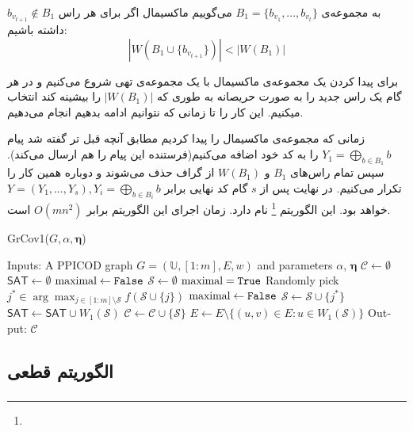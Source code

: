 به مجموعه‌ی 
$B_1 = \{b_{v_1}, \ldots, b_{v_t}\}$
می‌گوییم ماکسیمال اگر برای هر راس
$b_{v_{t  +1}} \notin B_1$
داشته باشیم:
\begin{equation}
	\tag{شرط ماکسیمال بودن}
	|W(B_1 \cup \{b_{v_{t + 1}} \})| < |W(B_1)|
\end{equation}

برای پیدا کردن یک مجموعه‌ی ماکسیمال با یک مجموعه‌ی تهی شروع می‌کنیم و در هر گام یک راس جدید را به صورت حریصانه به طوری که 
$|W(B_1)|$
را بیشینه کند انتخاب میکنیم. این کار را تا زمانی که نتوانیم ادامه بدهیم انجام می‌دهیم.

زمانی که مجموعه‌ی ماکسیمال را پیدا کردیم مطابق آنچه قبل تر گفته شد پیام
 $Y_1 = \bigoplus\limits_{b \in B_1} b$
 را به کد خود اضافه می‌کنیم(فرستنده این پیام را هم ارسال می‌کند). سپس تمام راس‌های
 $B_1$
 و
 $W(B_1)$
 از گراف حذف می‌شوند و دوباره همین کار را تکرار می‌کنیم. در نهایت پس از 
 $s$
 گام کد نهایی برابر
 $Y = (Y_1, \ldots, Y_s), Y_i =  \bigoplus\limits_{b \in B_i} b$
 خواهد بود. این الگوریتم
 \GRCOVone\footnote{}
 	نام دارد. زمان اجرای این الگوریتم برابر
 	$O(mn^2)$
 	است.
 	\begin{latin}
 	\begin{algorithm}[H]
 		\caption{GrCov1($G,\alpha,\boldsymbol{\eta}$) \cite{bibid}}
 		\label{algorithm:grcov1}
 		\begin{algorithmic}[1]
 			\State Inputs: A PPICOD graph $G=(\mathbb{U}, [1:m], E, w)$ and parameters $\alpha$, $\boldsymbol{\eta}$
 			\State $\mathcal{C} \gets \emptyset$
 			\State $\mathsf{SAT} \gets \emptyset$ 
 			\State $\textrm{maximal} \gets \texttt{False}$
 			\State $\mathcal{S} \gets \emptyset$
 			\State $\textrm{maximal} = \texttt{True}$
 			\State Randomly pick $j^* \in \arg \max_{j \in [1:m] \setminus \mathcal{S}} f(\mathcal{S} \cup \{j\})$
 			\State $\textrm{maximal} \gets \texttt{False}$
 			\State $\mathcal{S} \gets \mathcal{S} \cup \{j^*\}$
 			\EndIf
 			\EndWhile
 			\State $\mathsf{SAT} \gets \mathsf{SAT} \cup W_1(\mathcal{S})$
 			\State $\mathcal{C} \gets \mathcal{C} \cup \{\mathcal{S}\}$
 			\State $E \gets E \setminus \{ (u,v) \in E: u \in W_1(\mathcal{S})\}$
 			\EndWhile
 			\State Output: $\mathcal{C}$
 		\end{algorithmic}
 	\end{algorithm}
 	\end{latin}
 \subsubsection{
 }
\subsubsection{}
\subsection{الگوریتم قطعی}
\subsubsection{}








